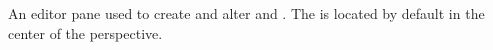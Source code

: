 \item[\gdtestcaseeditor]{
An editor pane used to create and alter \gdcases and \gdsteps{}. The \gdtestcaseeditor is located by default in the center of the \GD perspective.
}
